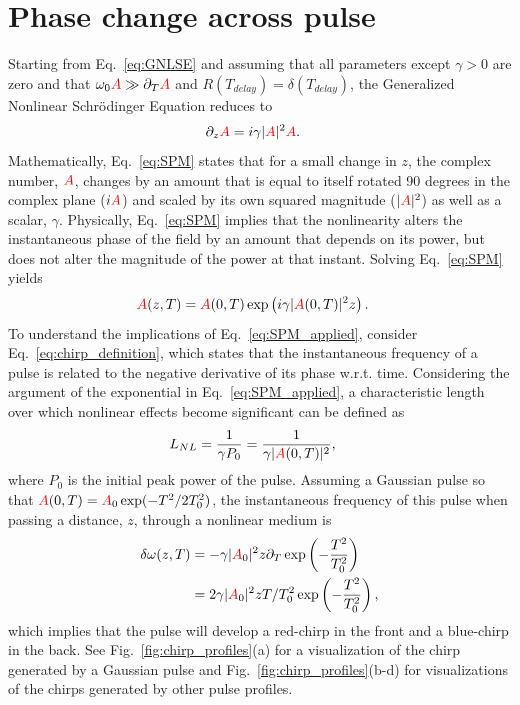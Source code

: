 \section{Phase change across pulse}
Starting from Eq.~\ref{eq:GNLSE} and assuming that all parameters except $\gamma>0$ are zero and that $\omega_0\textcolor{red}{A}\gg\partial_T\textcolor{red}{A}$ and $R(T_{delay})=\delta(T_{delay})$, the Generalized Nonlinear Schr{\"o}dinger Equation reduces to
\begin{align}
\label{eq:SPM}
    \partial_z\textcolor{red}{A} &= i\gamma|\textcolor{red}{A}|^2\textcolor{red}{A}.
\end{align}
Mathematically, Eq.~\ref{eq:SPM} states that for a small change in $z$, the complex number, $\textcolor{red}{A}$, changes by an amount that is equal to itself rotated 90 degrees in the complex plane ($i\textcolor{red}{A}$) and scaled by its own squared magnitude ($|\textcolor{red}{A}|^2$) as well as a scalar, $\gamma$. Physically, Eq.~\ref{eq:SPM} implies that the nonlinearity alters the instantaneous phase of the field by an amount that depends on its power, but does not alter the magnitude of the power at that instant. Solving Eq.~\ref{eq:SPM} yields
\begin{align}
    \label{eq:SPM_applied}
    \textcolor{red}{A}(z,T)&= \textcolor{red}{A}(0,T)\exp\left( i\gamma|\textcolor{red}{A}(0,T)|^2z \right).
\end{align}
To understand the implications of Eq.~\ref{eq:SPM_applied}, consider Eq.~\ref{eq:chirp_definition}, which states that the instantaneous frequency of a pulse is related to the negative derivative of its phase w.r.t. time. Considering the argument of the exponential in Eq.~\ref{eq:SPM_applied}, a characteristic length over which nonlinear effects become significant can be defined as
\begin{align}
    L_{NL} &= \frac{1}{\gamma P_0} = \frac{1}{\gamma |\textcolor{red}{A}(0,T)|^2},  
\end{align}
where $P_0$ is the initial peak power of the pulse. Assuming a Gaussian pulse so that $\textcolor{red}{A}(0,T)=\textcolor{red}{A}_0\exp(-T^2/2T_0^2)$, the instantaneous frequency of this pulse when passing a distance, $z$, through a nonlinear medium is
\begin{align}
\label{eq:SPM_example}
    \delta\omega(z,T) &= -\gamma |\textcolor{red}{A}_0|^2 z\partial_T \exp\left(-\frac{T^2}{T_0^2}\right)\\ \nonumber
    &= 2\gamma |\textcolor{red}{A}_0|^2 z T/T_0^2 \exp\left(-\frac{T^2}{T_0^2}\right),
\end{align}
which implies that the pulse will develop a red-chirp in the front and a blue-chirp in the back. See Fig.~\ref{fig:chirp_profiles}(a) for a visualization of the chirp generated by a Gaussian pulse and Fig.~\ref{fig:chirp_profiles}(b-d) for visualizations of the chirps generated by other pulse profiles. 

